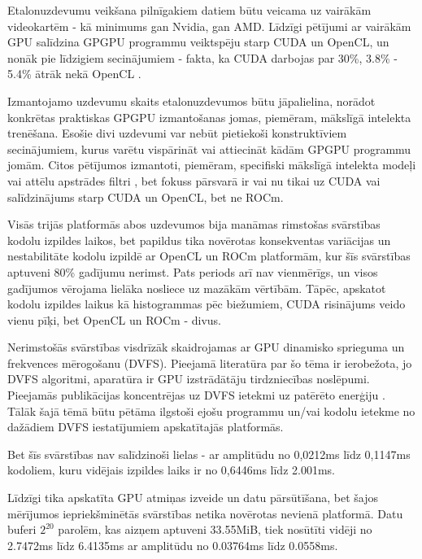 Etalonuzdevumu veikšana pilnīgakiem datiem būtu veicama uz vairākām videokartēm
- kā minimums gan Nvidia, gan AMD. Līdzīgi pētījumi ar vairākām GPU salīdzina
GPGPU programmu veiktspēju starp CUDA un OpenCL, un nonāk pie līdzigiem
secinājumiem -  fakta, ka CUDA darbojas par 30\%, 3.8\% - 5.4\% ātrāk nekā
OpenCL \cite{6047190, memeti2017benchmarkingopenclopenaccopenmp}.

Izmantojamo uzdevumu skaits etalonuzdevumos būtu jāpalielina, norādot konkrētas
praktiskas GPGPU izmantošanas jomas, piemēram, mākslīgā intelekta  trenēšana.
Esošie divi uzdevumi var nebūt pietiekoši konstruktīviem secinājumiem,  kurus
varētu vispārināt vai attiecināt kādām GPGPU programmu jomām. Citos pētījumos
izmantoti, piemēram, specifiski mākslīgā intelekta modeļi
\cite{10.1145/3529538.3529980} vai attēlu apstrādes filtri
\cite{memeti2017benchmarkingopenclopenaccopenmp}, bet fokuss pārsvarā ir vai nu
tikai uz CUDA vai salīdzinājums starp CUDA un OpenCL, bet ne ROCm.

Visās trijās platformās abos uzdevumos bija manāmas rimstošas svārstības
kodolu izpildes laikos, bet papildus tika novērotas konsekventas variācijas un
nestabilitāte kodolu izpildē ar OpenCL un ROCm platformām, kur šīs svārstības
aptuveni 80\% gadījumu nerimst. Pats periods arī nav vienmērīgs, un visos
gadījumos vērojama lielāka nosliece uz mazākām vērtībām. Tāpēc, apskatot
kodolu izpildes laikus kā histogrammas pēc biežumiem, CUDA risinājums veido
vienu pīķi, bet OpenCL un ROCm - divus.

Nerimstošās svārstības visdrīzāk skaidrojamas ar GPU dinamisko sprieguma un
frekvences mērogošanu (DVFS). Pieejamā literatūra par šo tēma ir ierobežota, jo
DVFS algoritmi, aparatūra ir GPU izstrādātāju tirdzniecības noslēpumi.
Pieejamās publikācijas koncentrējas uz DVFS ietekmi uz patērēto enerģiju
\cite{gpu-dvfs, MEI201789, GUERREIRO201993}. Tālāk šajā tēmā būtu pētāma ilgstoši ejošu programmu un/vai
kodolu ietekme no dažādiem DVFS iestatījumiem apskatītajās platformās.

Bet šīs svārstības nav salīdzinoši lielas - ar amplitūdu no 0,0212\si{\ms} līdz
0,1147\si{\ms} kodoliem, kuru vidējais izpildes laiks ir no 0,6446\si{\ms} līdz
2.001\si{\ms}.

Līdzīgi tika apskatīta GPU atmiņas izveide un datu pārsūtīšana, bet šajos
mērījumos iepriekšminētās svārstības netika novērotas nevienā platformā. Datu
buferi \(2^{20}\) parolēm, kas aizņem aptuveni 33.55MiB, tiek nosūtīti vidēji
no 2.7472\si{\ms} līdz 6.4135\si{\ms} ar amplitūdu no 0.03764\si{\ms}  līdz
0.0558\si{\ms}.

